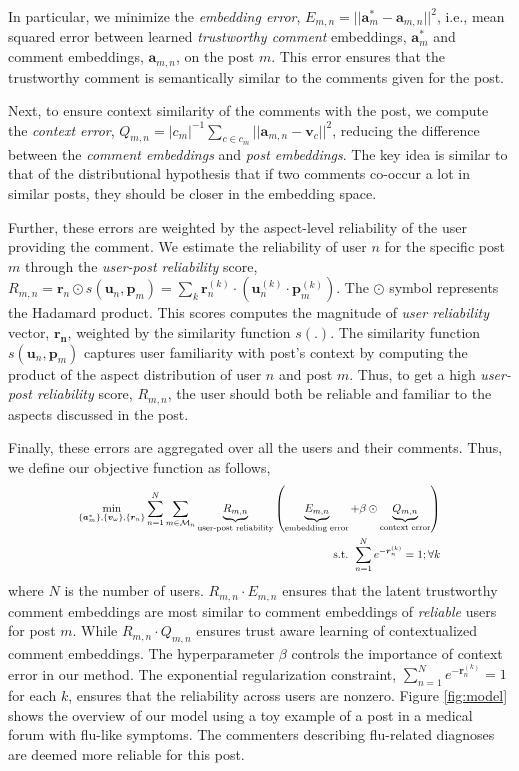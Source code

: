 In particular, we minimize the \emph{embedding error}, $E_{m,n} = \vert \vert \bm{a}_m^* - \bm{a}_{m,n} \vert \vert^ 2$, i.e., mean squared error between learned \emph{trustworthy comment} embeddings, $\bm{a}_m^*$ and comment embeddings, $\bm{a}_{m,n}$, on the post $m$. This error ensures that the trustworthy comment is semantically similar to the comments given for the post.

Next, to ensure context similarity of the comments with the post, we compute the \emph{context error}, $Q_{m,n}= \vert c_m \vert^{-1} \sum_{c \in c_m} \vert \vert \bm{a}_{m,n} - \bm{v}_c \vert \vert^2$, reducing the difference between the \emph{comment embeddings} and \emph{post embeddings}. The key idea is similar to that of the distributional hypothesis that if two comments co-occur a lot in similar posts, they should be closer in the embedding space.

Further, these errors are weighted by the aspect-level reliability of the user providing the comment.
We estimate the reliability of user $n$ for the specific post $m$ through the \emph{user-post reliability} score, $R_{m,n} = \bm{r}_n \odot s(\bm{u}_{n}, \bm{p}_{m}) = \sum_{k} \bm{r}_n^{(k)} \cdot (\bm{u}_{n}^{(k)} \cdot \bm{p}_{m}^{(k)} )$. The $\odot$ symbol represents the Hadamard product. This scores computes the magnitude of \emph{user reliability} vector, $\bm{r_n}$, weighted by the similarity function $s(.)$.
The similarity function $s(\bm{u}_{n}, \bm{p}_{m})$ captures user familiarity with post's context by computing the product of the aspect distribution of user $n$ and post $m$.
Thus, to get a high \emph{user-post reliability} score, $R_{m,n}$, the user should both be reliable and familiar to the aspects discussed in the post.

Finally, these errors are aggregated over all the users and their comments.
Thus, we define our objective function as follows,
\begin{equation}
\resizebox{0.75\textwidth}{!}{$
\begin{aligned}
\underset{\{\bm{a}_m^{*}\}, \{\bm{v}_{\omega}\}, \{\bm{r}_n\} }{ \text{min}}
\sum_{n=1}^{N} \sum_{m \in \mathcal{M}_n} \underbrace{R_{m,n}}_{\text{user-post reliability}} \left( \underbrace{E_{m,n}}_{\text{embedding error}} + {\beta} \odot \underbrace{Q_{m,n}}_{\text{context error}} \right) \\
 \text{s.t. } \sum_{n=1}^N e^{-\bm{r}_n^{(k)}} = 1; \forall k
\end{aligned}
$}
\end{equation}
where $N$ is the number of users. $ R_{m, n} \cdot E_{m,n}$ ensures that the latent trustworthy comment embeddings are most similar to comment embeddings of \emph{reliable} users for post $m$. While $ R_{m,n} \cdot Q_{m,n}$ ensures trust aware learning of contextualized comment embeddings. The hyperparameter $\beta$ controls the importance of context error in our method. The exponential regularization constraint, $\sum_{n=1}^N e^{-\bm{r}_n^{(k)}}=1$ for each $k$, ensures that the reliability across users are nonzero. Figure \ref{fig:model} shows the overview of our model using a toy example of a post in a medical forum with flu-like symptoms. The commenters describing flu-related diagnoses are deemed more reliable for this post.

